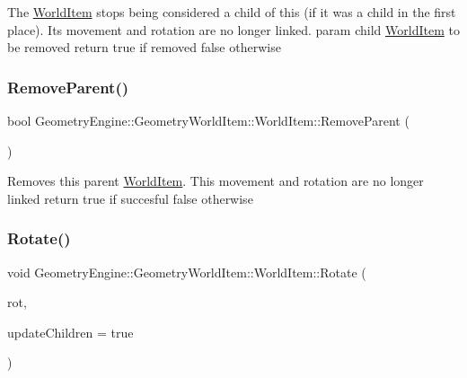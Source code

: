 The \mbox{\hyperlink{class_geometry_engine_1_1_geometry_world_item_1_1_world_item}{World\+Item}} stops being considered a child of this (if it was a child in the first place). Its movement and rotation are no longer linked. param child \mbox{\hyperlink{class_geometry_engine_1_1_geometry_world_item_1_1_world_item}{World\+Item}} to be removed return true if removed false otherwise \mbox{\label{class_geometry_engine_1_1_geometry_world_item_1_1_world_item_a3e77ca882db0fe70315921af492ebef8}} 
\subsubsection{\texorpdfstring{RemoveParent()}{RemoveParent()}}
{\footnotesize\ttfamily bool Geometry\+Engine\+::\+Geometry\+World\+Item\+::\+World\+Item\+::\+Remove\+Parent (\begin{DoxyParamCaption}{ }\end{DoxyParamCaption})}

Removes this parent \mbox{\hyperlink{class_geometry_engine_1_1_geometry_world_item_1_1_world_item}{World\+Item}}. This movement and rotation are no longer linked return true if succesful false otherwise \mbox{\label{class_geometry_engine_1_1_geometry_world_item_1_1_world_item_aee1168fdbce65dfac9d75dfe61015036}} 
\subsubsection{\texorpdfstring{Rotate()}{Rotate()}\hspace{0.1cm}{\footnotesize\ttfamily [1/2]}}
{\footnotesize\ttfamily void Geometry\+Engine\+::\+Geometry\+World\+Item\+::\+World\+Item\+::\+Rotate (\begin{DoxyParamCaption}\item[{const Q\+Vector3D \&}]{rot,  }\item[{bool}]{update\+Children = {\ttfamily true} }\end{DoxyParamCaption})}

